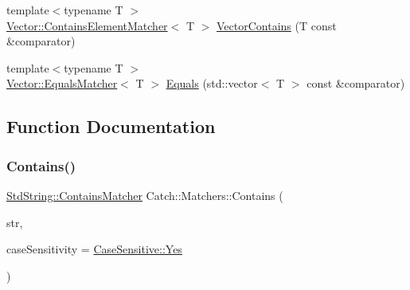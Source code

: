 \begin{DoxyCompactItemize}
\item 
{\footnotesize template$<$typename T $>$ }\\\mbox{\hyperlink{structCatch_1_1Matchers_1_1Vector_1_1ContainsElementMatcher}{Vector\+::\+Contains\+Element\+Matcher}}$<$ T $>$ \mbox{\hyperlink{namespaceCatch_1_1Matchers_ae8db5846328116fb36386893deaec944}{Vector\+Contains}} (T const \&comparator)
\item 
{\footnotesize template$<$typename T $>$ }\\\mbox{\hyperlink{structCatch_1_1Matchers_1_1Vector_1_1EqualsMatcher}{Vector\+::\+Equals\+Matcher}}$<$ T $>$ \mbox{\hyperlink{namespaceCatch_1_1Matchers_a332a401fb0da33c988e9cfa400ecce1b}{Equals}} (std\+::vector$<$ T $>$ const \&comparator)
\end{DoxyCompactItemize}


\subsection{Function Documentation}
\mbox{\label{namespaceCatch_1_1Matchers_a1f6c2accdc6cd75a84d7112dcad647b4}} 
\subsubsection{\texorpdfstring{Contains()}{Contains()}\hspace{0.1cm}{\footnotesize\ttfamily [1/2]}}
{\footnotesize\ttfamily \mbox{\hyperlink{structCatch_1_1Matchers_1_1StdString_1_1ContainsMatcher}{Std\+String\+::\+Contains\+Matcher}} Catch\+::\+Matchers\+::\+Contains (\begin{DoxyParamCaption}\item[{std\+::string const \&}]{str,  }\item[{\mbox{\hyperlink{structCatch_1_1CaseSensitive_aad49d3aee2d97066642fffa919685c6a}{Case\+Sensitive\+::\+Choice}}}]{case\+Sensitivity = {\ttfamily \mbox{\hyperlink{structCatch_1_1CaseSensitive_aad49d3aee2d97066642fffa919685c6aa7c5550b69ec3c502e6f609b67f9613c6}{Case\+Sensitive\+::\+Yes}}} }\end{DoxyParamCaption})}

\mbox{\label{namespaceCatch_1_1Matchers_a4b3621740dc515216ad31ab827d4092c}} 
